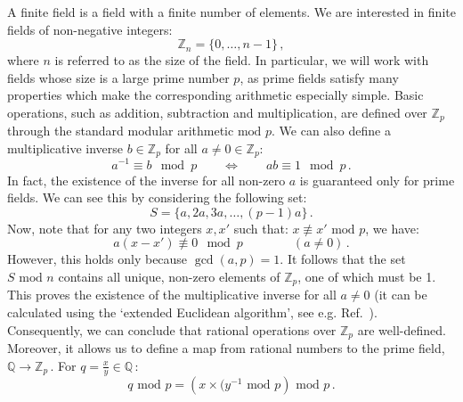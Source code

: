 \documentclass[main.tex]{subfiles}
\begin{document}
A finite field is a field with a finite number of elements. We are interested in finite fields of non-negative integers:
\begin{equation} \label{eq:ffdefinition}
    \mathbb{Z}_n = \{0, \ldots, n-1\}\,,    
\end{equation}
where $n$ is referred to as the size of the field. In particular, we will work with fields whose size is a large prime number $p$, as prime fields satisfy many properties which make the corresponding arithmetic especially simple. Basic operations, such as addition, subtraction and multiplication, are defined over $\mathbb{Z}_p$ through the standard modular arithmetic $\text{mod } p$. We can also define a multiplicative inverse $b\in \mathbb{Z}_p$ for all $a\neq0 \in \mathbb{Z}_p$:
\begin{equation}
    a^{-1} \equiv b \mod p \qquad \Longleftrightarrow \qquad ab \equiv 1 \mod p\,.
\end{equation}
In fact, the existence of the inverse for all non-zero $a$ is guaranteed only for prime fields. We can see this by considering the following set:
\begin{equation}
    S = \{a, 2a, 3a, \ldots, (p-1)a\}\,.
\end{equation}
Now, note that for any two integers $x, x'$ such that: $x \not\equiv x' \text{ mod } p$, we have:
\begin{equation}
    a(x-x') \not\equiv 0 \mod p \qquad \qquad (a \neq 0) \,.
\end{equation}
However, this holds only because $\gcd(a, p) = 1$. It follows that the set $S \text{ mod } n$ contains all unique, non-zero elements of $\mathbb{Z}_p$, one of which must be 1. This proves the existence of the multiplicative inverse for all $a \neq 0$ (it can be calculated using the `extended Euclidean algorithm', see e.g. Ref.~\cite{knuth2014art}). Consequently, we can conclude that rational operations over $\mathbb{Z}_p$ are well-defined. Moreover, it allows us to define a map from rational numbers to the prime field, $\mathbb{Q} \rightarrow \mathbb{Z}_p\,$. For $q=\frac{x}{y} \in \mathbb{Q}\,$: 
\begin{equation}
    q \text{ mod } p = \left(x \times (y^{-1} \text{ mod } p \right) \text{ mod } p\,.
\end{equation}
\end{document}

